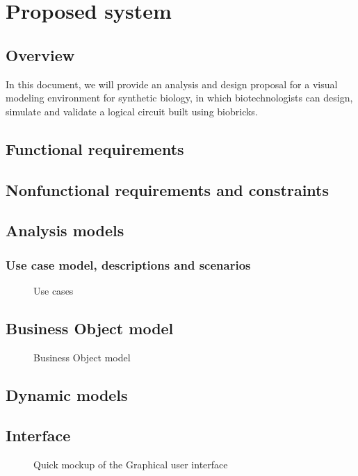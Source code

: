 \documentclass[a4paper]{article}
\begin{document}
\section{Proposed system}
\subsection{Overview} 		%
In this document, we will provide an analysis and design proposal for a visual modeling environment for synthetic biology, in which biotechnologists can design, simulate and validate a logical circuit built using biobricks.

\subsection{Functional requirements} %
\subsection{Nonfunctional requirements and constraints} %
\subsection{Analysis models}
\subsubsection{Use case model, descriptions and scenarios}
\begin{figure}[h!]
	\caption{Use cases}
	\begin{center}
	
	\end{center}
\end{figure}
\subsection{Business Object model} %
\begin{figure}[h!]
	\caption{Business Object model}
	\begin{center}
		
	\end{center}
\end{figure}

\subsection{Dynamic models}
\subsection{Interface} %
\begin{figure}[h!]
	\caption{Quick mockup of the Graphical user interface}
	\begin{center}
		
	\end{center}
\end{figure}
\end{document}
